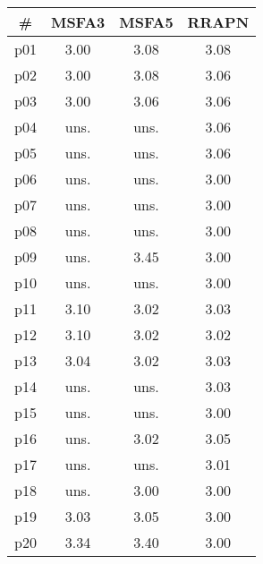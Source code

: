 \begin{tabular}{c||c|c|c}
\textbf{\#} & \textbf{MSFA3} & \textbf{MSFA5} & \textbf{RRAPN}\\
\hline
\hline
p01 & 3.00 & 3.08 & 3.08\\
p02 & 3.00 & 3.08 & 3.06\\
p03 & 3.00 & 3.06 & 3.06\\
p04 & uns. & uns. & 3.06\\
p05 & uns. & uns. & 3.06\\
p06 & uns. & uns. & 3.00\\
p07 & uns. & uns. & 3.00\\
p08 & uns. & uns. & 3.00\\
p09 & uns. & 3.45 & 3.00\\
p10 & uns. & uns. & 3.00\\
p11 & 3.10 & 3.02 & 3.03\\
p12 & 3.10 & 3.02 & 3.02\\
p13 & 3.04 & 3.02 & 3.03\\
p14 & uns. & uns. & 3.03\\
p15 & uns. & uns. & 3.00\\
p16 & uns. & 3.02 & 3.05\\
p17 & uns. & uns. & 3.01\\
p18 & uns. & 3.00 & 3.00\\
p19 & 3.03 & 3.05 & 3.00\\
p20 & 3.34 & 3.40 & 3.00\\
\end{tabular}

